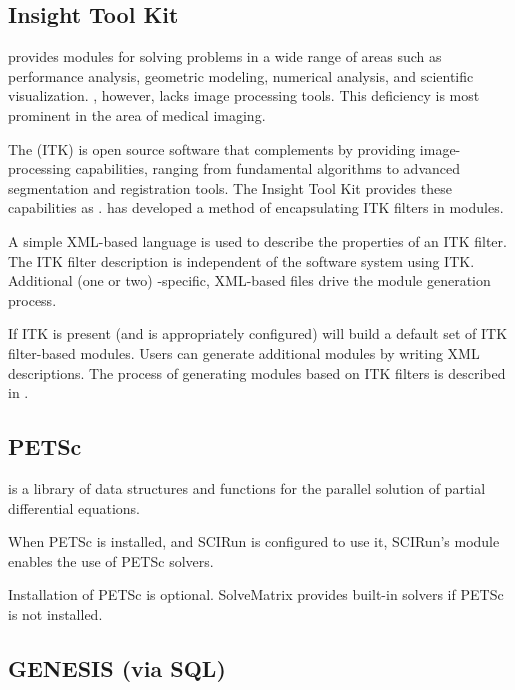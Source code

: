 \subsection{Insight Tool Kit}

\sr{} provides modules for solving problems in a wide range of areas
such as performance analysis, geometric modeling, numerical analysis,
and scientific visualization.  \sr{}, however, lacks image processing
tools. This deficiency is most prominent in the area of medical
imaging.

The  (ITK)
is open source software that complements \sr{} by providing
image-processing capabilities, ranging from fundamental algorithms to
advanced segmentation and registration tools.  The Insight Tool Kit
provides these capabilities as .  \sci{} has developed a
method of encapsulating ITK filters in \sr{} modules.

A simple XML-based language is used to describe the properties of an
ITK filter.  The ITK filter description is independent of the software
system using ITK.  Additional (one or two) \sr{}-specific, XML-based
files drive the module generation process.

If ITK is present (and \sr{} is appropriately configured) \sr{} will
build a default set of ITK filter-based modules.  Users can generate
additional modules by writing XML descriptions. The process of
generating modules based on ITK filters is described in
.

\subsection{PETSc}

 is a library of
data structures and functions for the parallel solution of partial
differential equations.

When PETSc is installed, and SCIRun is configured to use it, SCIRun's
 module enables the use of PETSc solvers.

Installation of PETSc is optional.  SolveMatrix provides built-in
solvers if PETSc is not installed.


\subsection{GENESIS (via SQL)}

